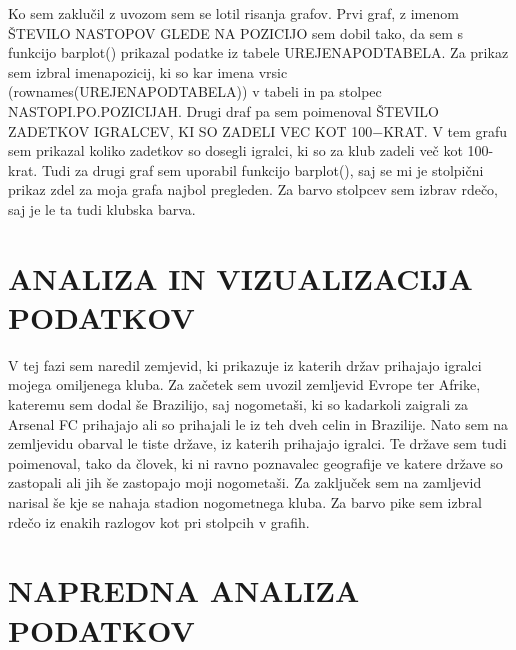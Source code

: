 \documentclass[11pt,a4paper]{article}
\begin{document}
Ko sem zaklučil z uvozom sem se lotil risanja grafov. Prvi graf, z imenom ŠTEVILO NASTOPOV GLEDE NA POZICIJO sem dobil tako, da sem s funkcijo barplot() prikazal podatke iz tabele UREJENAPODTABELA. Za prikaz sem izbral imenapozicij, ki so kar imena vrsic (rownames(UREJENAPODTABELA)) v tabeli in pa stolpec NASTOPI.PO.POZICIJAH.
Drugi draf pa sem poimenoval ŠTEVILO ZADETKOV IGRALCEV, KI SO ZADELI VEC KOT 100−KRAT. V tem grafu sem prikazal koliko zadetkov so dosegli igralci, ki so za klub zadeli več kot 100-krat. Tudi za drugi graf sem uporabil funkcijo barplot(), saj se mi je stolpični prikaz zdel za moja grafa najbol pregleden. Za barvo stolpcev sem izbrav rdečo, saj je le ta tudi klubska barva.




\newpage
\section{ANALIZA IN VIZUALIZACIJA PODATKOV}
V tej fazi sem naredil zemjevid, ki prikazuje iz katerih držav prihajajo igralci mojega omiljenega kluba. Za začetek sem uvozil zemljevid Evrope ter Afrike, kateremu sem dodal še Brazilijo, saj nogometaši, ki so kadarkoli zaigrali za Arsenal FC prihajajo ali so prihajali le iz teh dveh celin in Brazilije. Nato sem na zemljevidu obarval le tiste države, iz katerih prihajajo igralci. Te države sem tudi poimenoval, tako da človek, ki ni ravno poznavalec geografije ve katere države so zastopali ali jih še zastopajo moji nogometaši. Za zaključek sem na zamljevid narisal še kje se nahaja stadion nogometnega kluba. Za barvo pike sem izbral rdečo iz enakih razlogov kot pri stolpcih v grafih.



\section{NAPREDNA ANALIZA PODATKOV}
\end{document}
